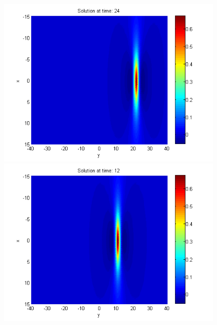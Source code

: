 \documentclass[a4paper]{article}
\theoremstyle{remark}
\begin{document}
\begin{large}
\begin{figure}[ht]
\begin{minipage}[b]{0.48\linewidth}
		 \includegraphics[width=\linewidth]{../amitans/figures/solution_128x90_bt1_c090_T24.png}
	\end{minipage}	
	\begin{minipage}[b]{0.48\linewidth}
		 \includegraphics[width=\linewidth]{../amitans/figures/solution_128x90_bt1_c090_T12.png}
	\end{minipage}
	\begin{minipage}[b]{0.48\linewidth}

\end{minipage}
\end{figure}
\end{large}
\end{document}
